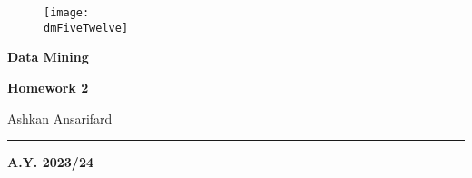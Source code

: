 \geometry{
	a4paper, %
	left=2cm, %
	right=2cm, %
	top=2.5cm, %
	bottom=2.5cm %
}




	
	\begin{center}
		\begin{figure}[h]
			\centering
			\texttt{[image: \\dmFiveTwelve]}
		\end{figure}
		\vspace{1cm} 
		{\fontsize{28}{34}\selectfont \textbf{Data Mining}}
	\end{center}

	\vspace{1cm} 
	
	\begin{center}
	{\fontsize{22}{28}\selectfont \textbf{Homework \underline{2}}}
	\end{center}

	\vspace{1cm} 

	\begin{center}
	{\fontsize{22}{28}\selectfont Ashkan Ansarifard}
	\end{center}

	\vspace{0.5cm} 
	
	\begin{center}
	{\fontsize{22}{28}}
	\end{center}

	\vspace{1cm} 
	
	\textcolor{blue!60!black}{\rule{\linewidth}{2pt}}
	
	\vspace{5cm} 
	
	\begin{center}
	\textbf{A.Y. 2023/24}
	\end{center}

	\thispagestyle{empty}
	
	\newpage
	
	\myTOC

